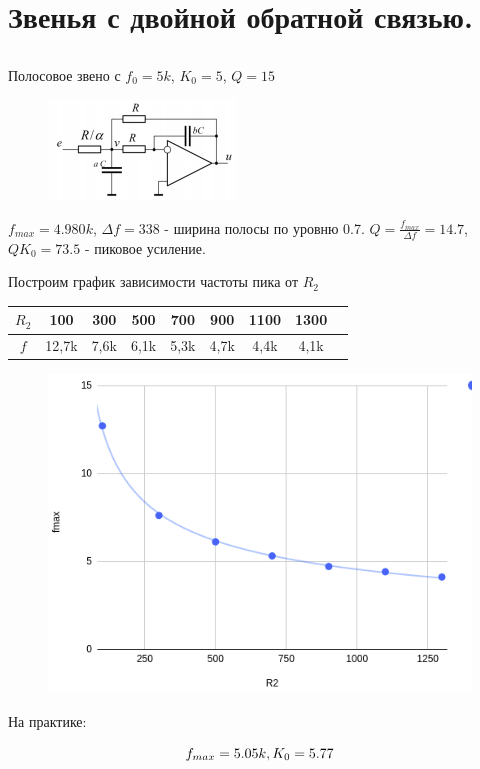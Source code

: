 \documentclass[a4paper, 12pt]{article}%
\begin{document}
\newpage
{}
\section{Звенья с двойной обратной связью.}
\subsection{}

Полосовое звено с $f_0 = 5k$, $K_0 = 5$, $Q = 15$

\begin{figure}[h!]
    \centering
    \includegraphics[width=0.3\linewidth]{pic12.png}
\end{figure}

$f_{max} = 4.980k$, $\Delta f = 338$ - ширина полосы по уровню 0.7.
$Q=\frac{f_{max}}{\Delta f} = 14.7$, $QK_0 = 73.5$ - пиковое усиление.

Построим график зависимости частоты пика от $R_2$

\begin{center}
\begin{tabular}{|c|c|c|c|c|c|c|c|c|}
\hline 
$R_2$ & 100 & 300 & 500 & 700 & 900 & 1100 & 1300 \\ 
\hline 
$f$ & 12,7k & 7,6k & 6,1k & 5,3k & 4,7k & 4,4k & 4,1k \\ 
\hline 
\end{tabular} 
\end{center}


\begin{figure}[h!]
    \centering
    \includegraphics[width=0.6\linewidth]{pic14.png}
\end{figure}


На практике:


\begin{equation*}
	f_{max} = 5.05k, \hfill K_0 = 5.77
\end{equation*}
\end{document}
